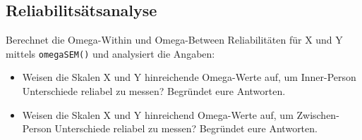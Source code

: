\documentclass[
  letterpaper,
  DIV=11,
  numbers=noendperiod]{scrreprt}
\providecommand{\tightlist}{%
  \setlength{\itemsep}{0pt}\setlength{\parskip}{0pt}}\usepackage{longtable,booktabs,array}
\begin{document}
\subsection{Reliabilitsätsanalyse}\label{reliabilitsuxe4tsanalyse}

Berechnet die Omega-Within und Omega-Between Reliabilitäten für X und Y
mittels \texttt{omegaSEM()} und analysiert die Angaben:

\begin{itemize}
\tightlist
\item
  Weisen die Skalen X und Y hinreichende Omega-Werte auf, um
  Inner-Person Unterschiede reliabel zu messen? Begründet eure
  Antworten.
\item
  Weisen die Skalen X und Y hinreichend Omega-Werte auf, um
  Zwischen-Person Unterschiede reliabel zu messen? Begründet eure
  Antworten.
\end{itemize}
\end{document}
